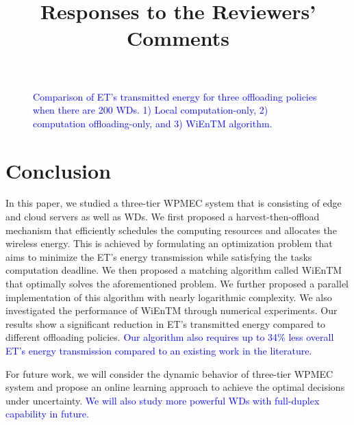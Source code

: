 \documentclass[12pt,draftclsnofoot,onecolumn]{IEEEtran}
\begin{document}
\begin{figure}
\begin{subfigure}[b]{.24\textwidth}
		\caption{} \label{fig:9b}
	\end{subfigure}
	
	\caption{\textcolor{blue}{Comparison of ET's transmitted energy for three offloading policies when there are 200 WDs. 1) Local computation-only, 2) computation offloading-only, and 3) WiEnTM algorithm.}} \label{fig:9}
\end{figure}

\section{Conclusion}
In this paper, we studied a three-tier WPMEC system that is consisting of edge and cloud servers as well as WDs. We first proposed a harvest-then-offload mechanism that efficiently schedules the computing resources and allocates the wireless energy. This is achieved by formulating an optimization problem that aims to minimize the ET's energy transmission while satisfying the tasks computation deadline. We then proposed a matching algorithm called WiEnTM that optimally solves the aforementioned problem. We further proposed a parallel implementation of this algorithm with nearly logarithmic complexity. We also investigated the performance of WiEnTM through numerical experiments. Our results show a significant reduction in ET's transmitted energy compared to different offloading policies. \textcolor{blue}{Our algorithm also requires up to 34\% less overall ET's energy transmission compared to an existing work in the literature.}

For future work, we will consider the dynamic behavior of three-tier WPMEC system and propose an online learning approach to achieve the optimal decisions under uncertainty. \textcolor{blue}{We will also study more powerful WDs with full-duplex capability in future.}




\title{Responses to the Reviewers' Comments}

\maketitle

\vspace{-1.5cm}

\setcounter{page}{1}
\end{document}

